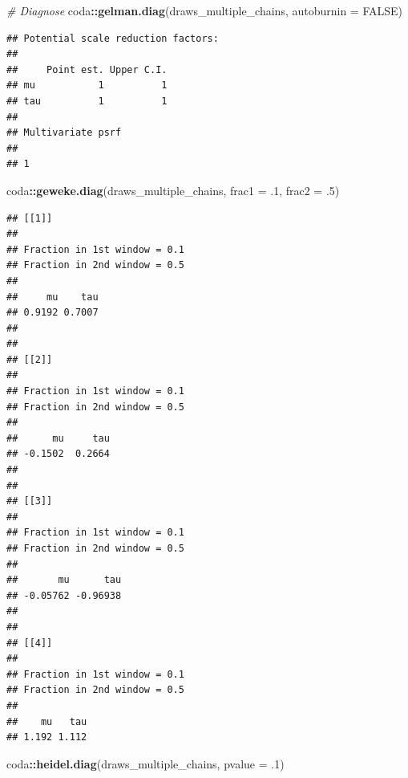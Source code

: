 \documentclass[
  11pt,
]{article}
\newenvironment{Shaded}{\begin{snugshade}}{\end{snugshade}}
\newcommand{\AttributeTok}[1]{\textcolor[rgb]{0.13,0.29,0.53}{#1}}
\newcommand{\CommentTok}[1]{\textcolor[rgb]{0.56,0.35,0.01}{\textit{#1}}}
\newcommand{\ConstantTok}[1]{\textcolor[rgb]{0.56,0.35,0.01}{#1}}
\newcommand{\DecValTok}[1]{\textcolor[rgb]{0.00,0.00,0.81}{#1}}
\newcommand{\FunctionTok}[1]{\textcolor[rgb]{0.13,0.29,0.53}{\textbf{#1}}}
\newcommand{\NormalTok}[1]{#1}
\newcommand{\SpecialCharTok}[1]{\textcolor[rgb]{0.81,0.36,0.00}{\textbf{#1}}}
\begin{document}
\begin{Shaded}
\begin{Highlighting}[]
\CommentTok{\# Diagnose}
\NormalTok{coda}\SpecialCharTok{::}\FunctionTok{gelman.diag}\NormalTok{(draws\_multiple\_chains, }\AttributeTok{autoburnin =} \ConstantTok{FALSE}\NormalTok{)}
\end{Highlighting}
\end{Shaded}

\begin{verbatim}
## Potential scale reduction factors:
## 
##     Point est. Upper C.I.
## mu           1          1
## tau          1          1
## 
## Multivariate psrf
## 
## 1
\end{verbatim}

\begin{Shaded}
\begin{Highlighting}[]
\NormalTok{coda}\SpecialCharTok{::}\FunctionTok{geweke.diag}\NormalTok{(draws\_multiple\_chains, }\AttributeTok{frac1 =}\NormalTok{ .}\DecValTok{1}\NormalTok{, }\AttributeTok{frac2 =}\NormalTok{ .}\DecValTok{5}\NormalTok{)  }
\end{Highlighting}
\end{Shaded}

\begin{verbatim}
## [[1]]
## 
## Fraction in 1st window = 0.1
## Fraction in 2nd window = 0.5 
## 
##     mu    tau 
## 0.9192 0.7007 
## 
## 
## [[2]]
## 
## Fraction in 1st window = 0.1
## Fraction in 2nd window = 0.5 
## 
##      mu     tau 
## -0.1502  0.2664 
## 
## 
## [[3]]
## 
## Fraction in 1st window = 0.1
## Fraction in 2nd window = 0.5 
## 
##       mu      tau 
## -0.05762 -0.96938 
## 
## 
## [[4]]
## 
## Fraction in 1st window = 0.1
## Fraction in 2nd window = 0.5 
## 
##    mu   tau 
## 1.192 1.112
\end{verbatim}

\begin{Shaded}
\begin{Highlighting}[]
\NormalTok{coda}\SpecialCharTok{::}\FunctionTok{heidel.diag}\NormalTok{(draws\_multiple\_chains, }\AttributeTok{pvalue =}\NormalTok{ .}\DecValTok{1}\NormalTok{)             }
\end{Highlighting}
\end{Shaded}
\end{document}
